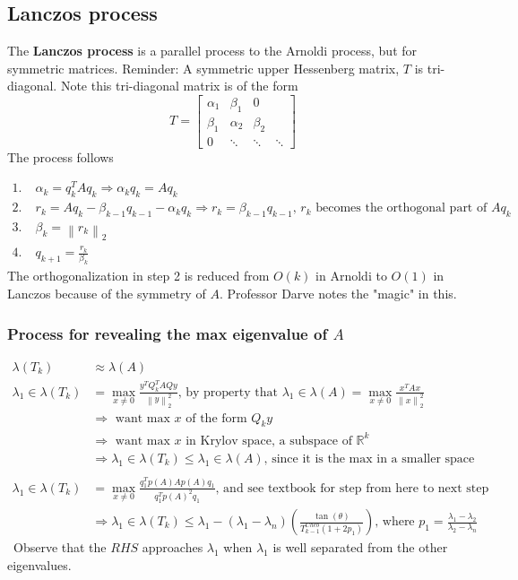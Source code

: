 \documentclass{article}
\newcommand{\norm}[2]{\left\lVert#1\right\rVert_#2}
\begin{document}
\subsection{Lanczos process}
The \textbf{Lanczos process} is a parallel process to the Arnoldi process, but for symmetric matrices. Reminder: A symmetric upper Hessenberg matrix, $T$ is tri-diagonal. Note this tri-diagonal matrix is of the form
\begin{equation*}
    T = \begin{bmatrix}
        \alpha_1 & \beta_1 & 0\\
        \beta_1 & \alpha_2 & \beta_2 \\
        0 & \ddots & \ddots & \ddots
    \end{bmatrix}
\end{equation*}
The process follows

\begin{align*}
    1. \;& \alpha_k = q_k^TAq_k \Longrightarrow \alpha_kq_k = Aq_k\\
    2. \;& r_k = Aq_k - \beta_{k-1}q_{k-1} - \alpha_kq_k \Longrightarrow r_k = \beta_{k-1}q_{k-1} \textrm{, $r_k$ becomes the orthogonal part of $Aq_k$}\\
    3. \;& \beta_k = \norm{r_k}{2}\\
    4. \;& q_{k+1} = \frac{r_k}{\beta_k}
\end{align*}
The orthogonalization in step 2 is reduced from $O(k)$ in Arnoldi to $O(1)$ in Lanczos because of the symmetry of $A$. Professor Darve notes the "magic" in this. 

\subsubsection{Process for revealing the max eigenvalue of $A$}
\begin{align*}
    \lambda(T_k) &\approx \lambda(A)\\
    \lambda_1 \in \lambda(T_k) &= \max_{x \neq 0} \frac{y^TQ_k^TAQy}{\norm{y}{2}^2} \textrm{, by property that } \lambda_1 \in \lambda(A) = \max_{x \neq 0} \frac{x^TAx}{\norm{x}{2}^2}\\
    &\Longrightarrow \textrm{ want max $x$ of the form } Q_ky \\
    &\Longrightarrow \textrm{ want max $x$ in Krylov space, a subspace of } \mathbb{R}^k\\
    &\Longrightarrow \lambda_1 \in \lambda(T_k) \leq \lambda_1 \in \lambda(A) \textrm{, since it is the max in a smaller space} \\ \\
    \lambda_1 \in \lambda(T_k) &= \max_{x \neq 0} \frac{q_1^Tp(A)Ap(A)q_1}{q_1^Tp(A)^2q_1} \textrm{, and see textbook for step from here to next step}\\
    &\Longrightarrow \lambda_1 \in \lambda(T_k) \leq \lambda_1 - (\lambda_1-\lambda_n)(\frac{\tan(\theta)}{T_{k-1}^{Cheb}(1+2p_1)}) \textrm{, where } p_1 = \frac{\lambda_1 - \lambda_2}{\lambda_2 - \lambda_n}
\end{align*}\
Observe that the $RHS$ approaches $\lambda_1$ when $\lambda_1$ is well separated from the other eigenvalues. 
\end{document}
